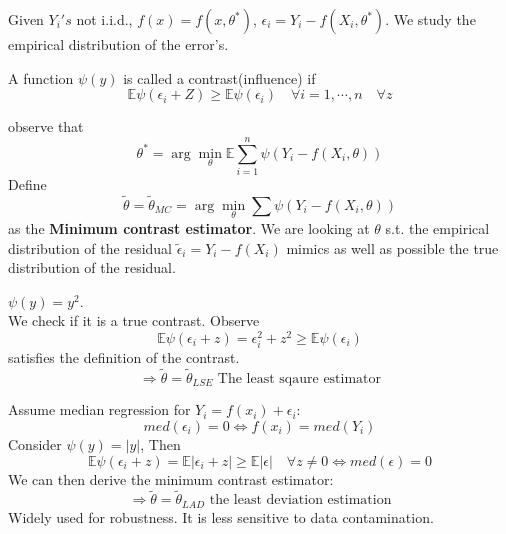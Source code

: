 Given $Y_i's$ not i.i.d., $f(x) = f(x, \theta^*)$, $\epsilon_i = Y_i - f(X_i, \theta^*)$. We study the empirical distribution of the error's. 
\begin{definition}
	A function $\psi(y)$ is called a contrast(influence) if 
	\begin{equation*}
		\mathbb{E} \psi(\epsilon_i + Z) \geq \mathbb{E} \psi(\epsilon_i) \quad \forall i = 1, \cdots, n \quad \forall z
	\end{equation*}
\end{definition}
observe that 
	\begin{equation*}
		\theta^* = \arg \min_\theta \mathbb{E} \sum_{i = 1}^{n} \psi(Y_i - f(X_i, \theta))
	\end{equation*}
Define
\begin{equation*}
		\tilde{\theta} = \tilde{\theta}_{MC} = \arg \min_\theta \sum \psi(Y_i - f(X_i, \theta))
\end{equation*}
as the \textbf{Minimum contrast estimator}. We are looking at $\theta$ s.t. the empirical distribution of the residual $\tilde{\epsilon}_i = Y_i - f(X_i)$ mimics as well as possible the true distribution of the residual.


\begin{example}
$\psi(y) = y^2$. \\We check if it is a true contrast. Observe
\begin{equation*}
	\mathbb{E} \psi(\epsilon_i + z) = \mathbb \epsilon_i^2 + z^2 \geq \mathbb{E} \psi(\epsilon_i)
\end{equation*}
satisfies the definition of the contrast.
\begin{equation*}
	\Rightarrow \tilde{\theta} = \tilde{\theta}_{LSE} \text{ The least sqaure estimator}
\end{equation*}
\end{example}


\begin{example}
 Assume median regression for $Y_i = f(x_i) + \epsilon_i$:
 \begin{equation*}
 	med(\epsilon_i) = 0 \Leftrightarrow f(x_i) = med(Y_i)
 \end{equation*}
	Consider $\psi(y) = |y|$, Then
	\begin{equation*}
		\mathbb{E}\psi(\epsilon_i + z) = \mathbb{E} |\epsilon_i + z| \geq \mathbb{E} |\epsilon| \quad \forall z \neq 0 \Leftrightarrow med(\epsilon) = 0
	\end{equation*}
	We can then derive the minimum contrast estimator:
	\begin{equation*}
		\Rightarrow \tilde{\theta} = \tilde{\theta}_{LAD} \text{ the least deviation estimation}
	\end{equation*}
	Widely used for robustness. It is less sensitive to data contamination.
\end{example}


